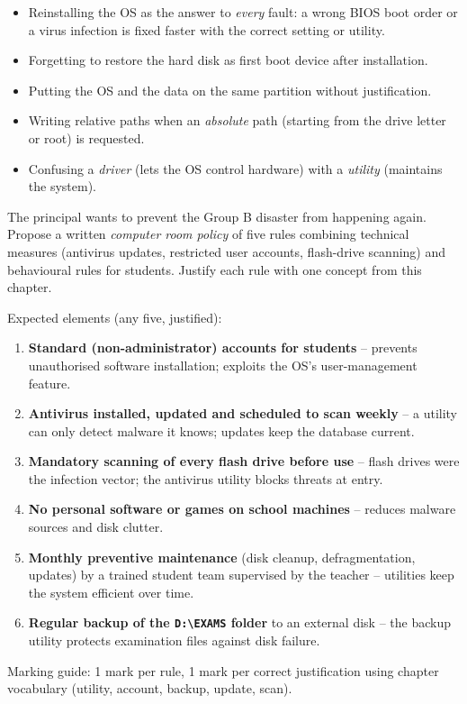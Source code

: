 \documentclass[11pt]{article}
\begin{document}
\begin{attention}
\begin{itemize}
\item Reinstalling the OS as the answer to \emph{every} fault: a wrong BIOS boot order or a virus infection is fixed faster with the correct setting or utility.
\item Forgetting to restore the hard disk as first boot device after installation.
\item Putting the OS and the data on the same partition without justification.
\item Writing relative paths when an \emph{absolute} path (starting from the drive letter or root) is requested.
\item Confusing a \emph{driver} (lets the OS control hardware) with a \emph{utility} (maintains the system).
\end{itemize}
\end{attention}

\begin{exercice}
The principal wants to prevent the Group B disaster from happening again. Propose a written \emph{computer room policy} of five rules combining technical measures (antivirus updates, restricted user accounts, flash-drive scanning) and behavioural rules for students. Justify each rule with one concept from this chapter.
\end{exercice}

\begin{corrige}
Expected elements (any five, justified):
\begin{enumerate}
\item \textbf{Standard (non-administrator) accounts for students} -- prevents unauthorised software installation; exploits the OS's user-management feature.
\item \textbf{Antivirus installed, updated and scheduled to scan weekly} -- a utility can only detect malware it knows; updates keep the database current.
\item \textbf{Mandatory scanning of every flash drive before use} -- flash drives were the infection vector; the antivirus utility blocks threats at entry.
\item \textbf{No personal software or games on school machines} -- reduces malware sources and disk clutter.
\item \textbf{Monthly preventive maintenance} (disk cleanup, defragmentation, updates) by a trained student team supervised by the teacher -- utilities keep the system efficient over time.
\item \textbf{Regular backup of the \texttt{D:\textbackslash EXAMS} folder} to an external disk -- the backup utility protects examination files against disk failure.
\end{enumerate}
Marking guide: 1 mark per rule, 1 mark per correct justification using chapter vocabulary (utility, account, backup, update, scan).
\end{corrige}
\end{document}
